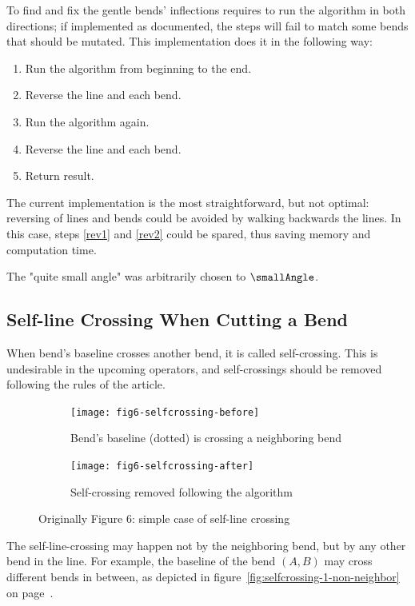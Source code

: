 \documentclass[a4paper]{article}
\newcommand{\onpage}[1]{\ref{#1} on page~\pageref{#1}}
\begin{document}
To find and fix the gentle bends' inflections requires to run the algorithm in
both directions; if implemented as documented, the steps will fail to match
some bends that should be mutated. This implementation does it in the following
way:

\begin{enumerate}
    \item Run the algorithm from beginning to the end.
    \item \label{rev1} Reverse the line and each bend.
    \item Run the algorithm again.
    \item \label{rev2} Reverse the line and each bend.
    \item Return result.
\end{enumerate}

The current implementation is the most straightforward, but not optimal:
reversing of lines and bends could be avoided by walking backwards the lines.
In this case, steps \ref{rev1} and \ref{rev2} could be spared, thus saving
memory and computation time.

The "quite small angle" was arbitrarily chosen to $\smallAngle$.

\subsection{Self-line Crossing When Cutting a Bend}

When bend's baseline crosses another bend, it is called self-crossing. This is
undesirable in the upcoming operators, and self-crossings should be removed
following the rules of the article.

\begin{figure}[h]
    \centering
    \begin{subfigure}[b]{.49\textwidth}
        \texttt{[image: fig6-selfcrossing-before]}
        \caption{Bend's baseline (dotted) is crossing a neighboring bend}
    \end{subfigure}
    \hfill
    \begin{subfigure}[b]{.49\textwidth}
        \texttt{[image: fig6-selfcrossing-after]}
        \caption{Self-crossing removed following the algorithm}
    \end{subfigure}
    \caption{Originally Figure 6: simple case of self-line crossing}
    \label{fig:fig6-selfcrossing}
\end{figure}

The self-line-crossing may happen not by the neighboring bend, but by any other
bend in the line. For example, the baseline of the bend $(A, B)$ may cross
different bends in between, as depicted in
figure~\onpage{fig:selfcrossing-1-non-neighbor}.
\end{document}
